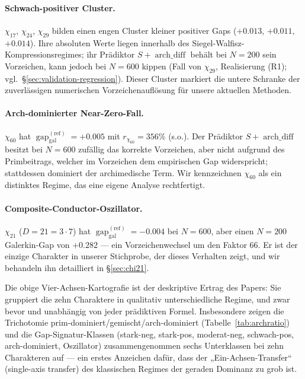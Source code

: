 \documentclass[10pt,twocolumn]{article}
\theoremstyle{definition}
\theoremstyle{remark}
\newcommand{\gap}{\operatorname{gap}}
\newcommand{\chifn}{\chi}
\newcommand{\archdiff}{\operatorname{arch\_diff}}
\begin{document}
\paragraph{Schwach-positiver Cluster.}
$\chifn_{17}$, $\chifn_{24}$, $\chifn_{29}$ bilden einen engen Cluster
kleiner positiver Gaps ($+0.013$, $+0.011$, $+0.014$). Ihre absoluten
Werte liegen innerhalb des Siegel-Walfisz-Kompressionsregimes; ihr
Prädiktor $S+\archdiff$ behält bei $N=200$ sein Vorzeichen, kann jedoch bei
$N=600$ kippen (Fall von $\chifn_{29}$, Realisierung (R1); vgl.\
\S\ref{sec:validation-regression}). Dieser Cluster markiert die untere
Schranke der zuverlässigen numerischen Vorzeichenauflösung für unsere aktuellen
Methoden.

\paragraph{Arch-dominierter Near-Zero-Fall.}
$\chifn_{60}$ hat $\gap_{\mathrm{gal}}^{(\mathrm{ref})}=+0.005$ mit
$r_{\chifn_{60}}=356\%$ (s.o.). Der Prädiktor $S+\archdiff$ besitzt bei $N=600$ zufällig
das korrekte Vorzeichen, aber nicht aufgrund
des Primbeitrags, welcher im Vorzeichen dem empirischen
Gap widerspricht; stattdessen dominiert der archimedische Term. Wir kennzeichnen $\chifn_{60}$
als ein distinktes Regime, das eine eigene Analyse rechtfertigt.

\paragraph{Composite-Conductor-Oszillator.}
$\chifn_{21}$ ($D=21=3\cdot 7$) hat $\gap_{\mathrm{gal}}^{(\mathrm{ref})}=-0.004$ bei
$N=600$, aber einen $N=200$ Galerkin-Gap von $+0.282$ --- ein Vorzeichenwechsel
um den Faktor $66$. Er ist der einzige Charakter in unserer Stichprobe, der dieses
Verhalten zeigt, und wir behandeln ihn detailliert in \S\ref{sec:chi21}.

\smallskip

Die obige Vier-Achsen-Kartografie ist der deskriptive Ertrag des Papers:
Sie gruppiert die zehn Charaktere in qualitativ unterschiedliche Regime, und
zwar bevor und unabhängig von jeder prädiktiven Formel. Insbesondere
zeigen die Trichotomie prim-dominiert/gemischt/arch-dominiert
(Tabelle~\ref{tab:archratio}) und die Gap-Signatur-Klassen
(stark-neg, stark-pos, moderat-neg, schwach-pos, arch-dominiert,
Oszillator) zusammengenommen sechs Unterklassen bei zehn Charakteren auf --- ein
erstes Anzeichen dafür, dass der „Ein-Achsen-Transfer“ (single-axis transfer) des klassischen
Regimes der geraden Dominanz \cite{RH_II} zu grob ist.
\end{document}
